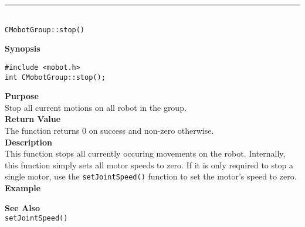 \noindent
\vspace{5pt}
\rule{4.5in}{0.015in}\\
\noindent
{\LARGE \texttt{CMobotGroup::stop()}}\\
{}

\noindent
{\bf Synopsis}\\
\begin{verbatim}
#include <mobot.h>
int CMobotGroup::stop();
\end{verbatim}

\noindent
{\bf Purpose}\\
Stop all current motions on all robot in the group.\\

\noindent
{\bf Return Value}\\
The function returns 0 on success and non-zero otherwise.\\

\noindent
{\bf Description}\\
This function stops all currently occuring movements on the robot. Internally, this function simply sets all motor speeds to zero. If it is only required to stop a single motor, use the 
\texttt{setJointSpeed()} function to set the motor's speed to zero. \\

\noindent
{\bf Example}\\
\noindent

\noindent
{\bf See Also}\\
\texttt{setJointSpeed()}

